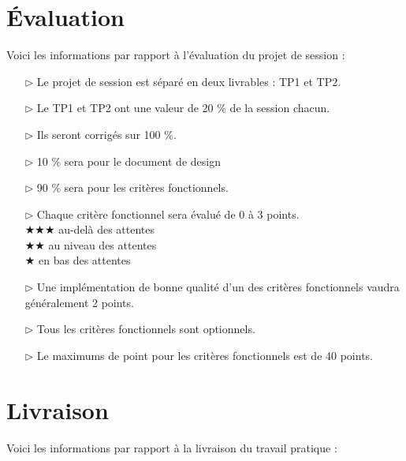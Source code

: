 \documentclass[12pt]{article}
\newcommand{\state}{\noindent}
\begin{document}
\pagebreak

\section*{Évaluation}

\state
Voici les informations par rapport à l'évaluation du projet de session :

\begin{itemize}
\item[$\triangleright$] Le projet de session est séparé en deux livrables : TP1 et TP2.
\item[$\triangleright$] Le TP1 et TP2 ont une valeur de 20 \% de la session chacun.
\item[$\triangleright$] Ils seront corrigés sur 100 \%.
\item[$\triangleright$] 10 \% sera pour le document de design
\item[$\triangleright$] 90 \% sera pour les critères fonctionnels.
\item[$\triangleright$] Chaque critère fonctionnel sera évalué de 0 à 3 points. \\
$\bigstar\bigstar\bigstar$ au-delà des attentes\\
$\bigstar\bigstar$ au niveau des attentes\\
$\bigstar$ en bas des attentes
\item[$\triangleright$] Une implémentation de bonne qualité d'un des critères fonctionnels vaudra généralement 2 points.
\item[$\triangleright$] Tous les critères fonctionnels sont optionnels.
\item[$\triangleright$] Le maximums de point pour les critères fonctionnels est de 40 points. \\
\end{itemize}

\pagebreak

\section*{Livraison}

\state
Voici les informations par rapport à la livraison du travail pratique :
\end{document}
